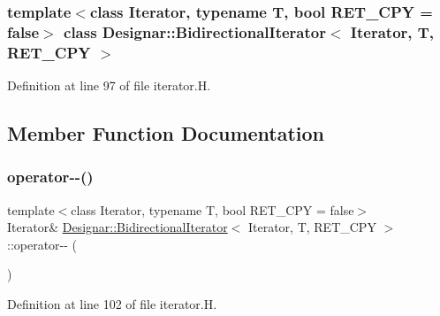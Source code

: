 \subsubsection*{template$<$class Iterator, typename T, bool R\+E\+T\+\_\+\+C\+PY = false$>$\newline
class Designar\+::\+Bidirectional\+Iterator$<$ Iterator, T, R\+E\+T\+\_\+\+C\+P\+Y $>$}



Definition at line 97 of file iterator.\+H.



\subsection{Member Function Documentation}
\mbox{\label{class_designar_1_1_bidirectional_iterator_aac9847e9868e270c4266a6fa0323a6ef}} 
\subsubsection{\texorpdfstring{operator-\/-\/()}{operator--()}\hspace{0.1cm}{\footnotesize\ttfamily [1/2]}}
{\footnotesize\ttfamily template$<$class Iterator, typename T, bool R\+E\+T\+\_\+\+C\+PY = false$>$ \\
Iterator\& \hyperlink{class_designar_1_1_bidirectional_iterator}{Designar\+::\+Bidirectional\+Iterator}$<$ Iterator, T, R\+E\+T\+\_\+\+C\+PY $>$\+::operator-\/-\/ (\begin{DoxyParamCaption}{ }\end{DoxyParamCaption})\hspace{0.3cm}{\ttfamily [inline]}}



Definition at line 102 of file iterator.\+H.

\mbox{\label{class_designar_1_1_bidirectional_iterator_a71602759debbdd18c89ffddb2217acb3}} 
